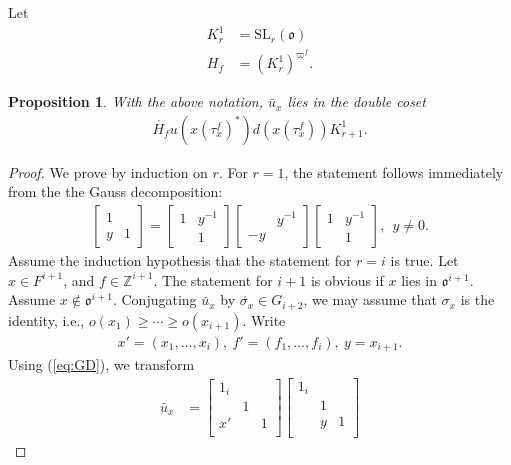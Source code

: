 \documentclass[11pt]{amsart}
\newcommand\s{\sigma}%
\newcommand\Vp{\varpi}%
\newcommand\vp{\varphi}%
\newcommand\oo{\mathfrak{o}}
\newcommand\Z{{\mathbb{Z}}}
\newcommand\1{\mathbf{1}}
\newcommand\ac{\acute}
\newcommand\SL{{\mathrm{SL}}}
\newcommand\bu{\bar{u}}
\numberwithin{equation}{section}
\newtheorem{prop}[thm]{Proposition}
\begin{document}
Let
\begin{align*}
K_r^1 &= \SL_r(\oo) \\
H_f &= (K_r^1)^{\Vp^f}.
\end{align*}
\begin{prop}\label{prop:LST}
With the above notation, $\bu_x$ lies in the double coset 
\begin{align*}
\ac{H_f} u(x(\tau_x^f)^*) d(x(\tau_x^f)) K^1_{r+1}.
\end{align*}  
\end{prop}
\begin{proof}
We prove by induction on $r$.
For $r = 1$, the statement follows immediately from the the Gauss decomposition: 
\begin{align}
\begin{bmatrix}
1&  \\
y &1
\end{bmatrix} = \begin{bmatrix}
1& y^{-1}  \\
&1
\end{bmatrix}
\begin{bmatrix}
& y^{-1} \\
-y &
\end{bmatrix}\begin{bmatrix}
1&y^{-1}  \\
&1
\end{bmatrix}, \ \ y \neq 0. \label{eq:GD}
\end{align} 
Assume the induction hypothesis that the statement for $r = i$ is true.
Let $x \in F^{i+1}$, and $f \in \Z^{i+1}$.
The statement for $i+1$ is obvious if $x$ lies in $\oo^{i+1}$.
Assume $x \not\in \oo^{i+1}$.
Conjugating $\bu_x$ by $\ac{\s_x} \in G_{i+2}$, we may assume that $\s_x$ is the identity, i.e., $o(x_1) \ge \cdots \ge o(x_{i+1})$.
Write
\begin{align*}
x' = (x_{1}, \ldots, x_i), \ f' = (f_{1}, \ldots, f_i), \ y = x_{i+1}.
\end{align*}
Using (\ref{eq:GD}), we transform
\begin{align*}
\bar{u}_x &= 
\begin{bmatrix}
1_{i} & & \\
 &1 &  \\
x' & &1  \\
\end{bmatrix}
\begin{bmatrix}
1_{i} & & \\
 &1 &  \\
 & y &1  \\

\end{bmatrix}
\end{align*}
\end{proof}
\end{document}
